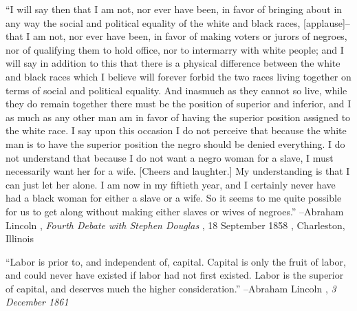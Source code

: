 \documentclass{article}%
\begin{document}
\begin{minipage}{\textwidth}%
\flushleft%
“I will say then that I am not, nor ever have been, in favor of bringing about in any way the social and political equality of the white and black races,  {[}applause{]}–that I am not, nor ever have been, in favor of making voters or  jurors of negroes, nor of qualifying them to hold office, nor to intermarry with  white people; and I will say in addition to this that there is a physical difference  between the white and black races which I believe will forever forbid the two races  living together on terms of social and political equality. And inasmuch as they  cannot so live, while they do remain together there must be the position of superior and inferior, and I as much as any other man am in favor of having the superior position assigned to the white race. I say upon this occasion I do not perceive that because the white man is to have the superior position the negro should be denied everything. I do not understand that because I do not want a negro woman for a slave, I must necessarily want her for a wife. {[}Cheers and laughter.{]} My understanding is that I can just let her alone. I am now in my fiftieth year, and I certainly never have had a black woman for either a slave or a wife. So it seems to me quite possible for us to get along without making either slaves or wives of negroes.”%
\linebreak%
\vspace{1mm}%
–Abraham Lincoln%
, \textit{Fourth Debate with Stephen Douglas}%
, 18 September 1858%
, Charleston, Illinois%
\linebreak%
\vspace{1mm}%
\end{minipage}%
\linebreak%
\vspace{1mm}%
\begin{minipage}{\textwidth}%
\flushleft%
“Labor is prior to, and independent of, capital. Capital is only the fruit of labor, and could never have existed if labor had not first existed. Labor is the superior of capital, and deserves much the higher consideration.”%
\linebreak%
\vspace{1mm}%
–Abraham Lincoln%
, \textit{3 December 1861}%
\linebreak%
\vspace{1mm}%
\end{minipage}%
\linebreak%
\vspace{1mm}%
\end{document}
